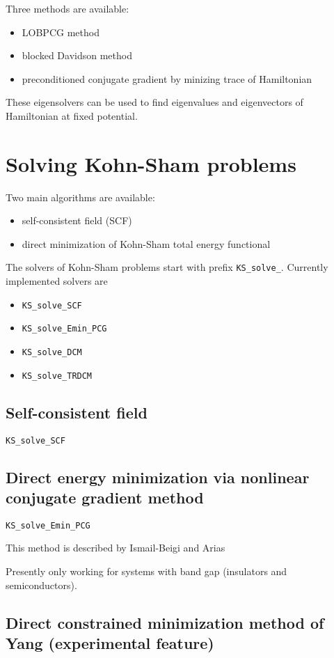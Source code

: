 \documentclass[a4paper,12pt]{article}
\newcommand{\jlcode}[1]{\texttt{#1}}
\begin{document}
Three methods are available:
\begin{itemize}
\item LOBPCG method
\item blocked Davidson method
\item preconditioned conjugate gradient by minizing trace of Hamiltonian
\end{itemize}

These eigensolvers can be used to find eigenvalues and eigenvectors
of Hamiltonian at fixed potential.



\section{Solving Kohn-Sham problems}

Two main algorithms are available:
\begin{itemize}
\item self-consistent field (SCF)
\item direct minimization of Kohn-Sham total energy functional
\end{itemize}

The solvers of Kohn-Sham problems start with prefix \jlcode{KS_solve_}.
Currently implemented solvers are
\begin{itemize}
\item \jlcode{KS_solve_SCF}
\item \jlcode{KS_solve_Emin_PCG}
\item \jlcode{KS_solve_DCM}
\item \jlcode{KS_solve_TRDCM}
\end{itemize}


\subsection{Self-consistent field}
\jlcode{KS_solve_SCF}


\subsection{Direct energy minimization via nonlinear conjugate gradient method}

\jlcode{KS_solve_Emin_PCG}

This method is described by Ismail-Beigi and Arias

Presently only working for systems with band gap (insulators and semiconductors).

\subsection{Direct constrained minimization method of Yang (experimental feature)}
\end{document}
